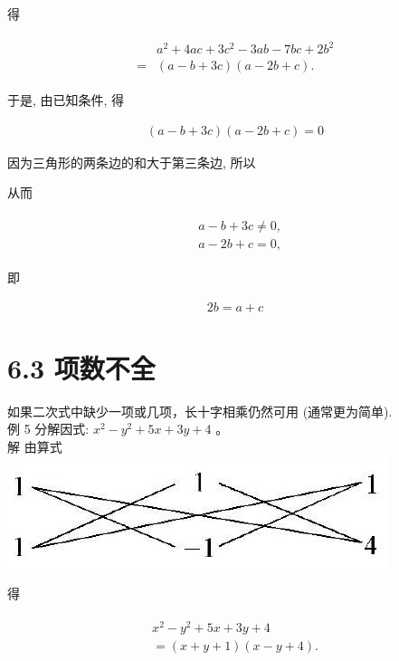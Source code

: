 \documentclass[10pt]{article}
\begin{document}
得

\begin{align*}
\begin{aligned}
& a^{2}+4 a c+3 c^{2}-3 a b-7 b c+2 b^{2} \\
= & (a-b+3 c)(a-2 b+c) .
\end{aligned}
\end{align*}

于是, 由已知条件, 得

\begin{align*}
(a-b+3 c)(a-2 b+c)=0
\end{align*}

因为三角形的两条边的和大于第三条边, 所以

从而

\begin{align*}
\begin{aligned}
& a-b+3 c \neq 0, \\
& a-2 b+c=0,
\end{aligned}
\end{align*}

即

\begin{align*}
2 b=a+c
\end{align*}

\section*{6.3 项数不全}
如果二次式中缺少一项或几项，长十字相乘仍然可用 (通常更为简单).\\
例 5 分解因式: $x^{2}-y^{2}+5 x+3 y+4$ 。\\
解 由算式\\
\includegraphics[max width=\textwidth, center]{2024_10_30_bd799899fef40368a068g-044(1)}

得

\begin{align*}
\begin{gathered}
x^{2}-y^{2}+5 x+3 y+4 \\
=(x+y+1)(x-y+4) .
\end{gathered}
\end{align*}
\end{document}
